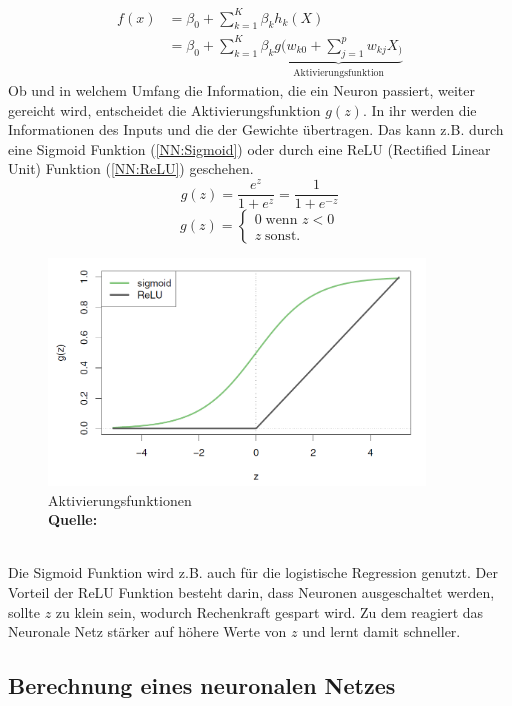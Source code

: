 \documentclass[a4paper,12pt]{thesis}
\newcommand*{\captionsource}[2]{%
	\caption[{#1}]{%
		#1%
		\\\hspace{\linewidth}%
		\textbf{Quelle:} #2%
	}%
}
\begin{document}
\begin{equation}
	\label{NN:SingleLayerNetwork}
	\begin{aligned}
		f(x)& = \beta_0 + \sum_{k = 1}^K \beta_k h_k (X)\\
		& = \beta_0  + \sum_{k = 1}^K \beta_k \underbrace{ g(w_{k0} + \sum_{j = 1}^p w_{kj} X_)}_{\text{Aktivierungsfunktion}}
	\end{aligned} 
\end{equation}
Ob und in welchem Umfang die Information, die ein Neuron passiert, weiter gereicht wird, entscheidet die Aktivierungsfunktion $g(z)$. In ihr werden die Informationen des Inputs und die der Gewichte übertragen. Das kann z.B. durch eine Sigmoid Funktion (\ref{NN:Sigmoid}) oder durch eine ReLU (Rectified Linear Unit) Funktion (\ref{NN:ReLU}) geschehen.
\begin{equation}
	\label{NN:Sigmoid}
	g(z)=\frac{e^z}{1+e^z}=\frac{1}{1+e^{-z}}
\end{equation}
\begin{equation}
	\label{NN:ReLU}
	g(z)=\begin{cases}
		0 \; \text{wenn $z<0$}
		\\
		z \; \text{sonst}.
	\end{cases}
\end{equation}
\begin{figure}[!ht]
	\centering
	\includegraphics[width=10cm]{Plots/NN2.png}
	\captionsource{Aktivierungsfunktionen}{
		\cite{James2013DL}
	}
	\label{NN2}
\end{figure}\\
Die Sigmoid Funktion wird z.B. auch für die logistische Regression genutzt. Der Vorteil der ReLU Funktion besteht darin, dass Neuronen ausgeschaltet werden, sollte $z$ zu klein sein, wodurch Rechenkraft gespart wird. Zu dem reagiert das Neuronale Netz stärker auf höhere Werte von $z$ und lernt damit schneller.

\subsection{Berechnung eines neuronalen Netzes}
\end{document}
